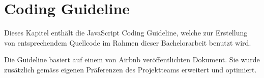 \chapter{Coding Guideline}
\label{sec:coding-guidelines}
Dieses Kapitel enthält die JavaScript Coding Guideline, welche zur Erstellung von entsprechendem Quellcode im Rahmen dieser Bachelorarbeit benutzt wird.

Die Guideline basiert auf einem von Airbnb \cite{Airbnb} veröffentlichten Dokument. Sie wurde zusätzlich gemäss eigenen Präferenzen \cite{JSGL} des Projektteams erweitert und optimiert.

